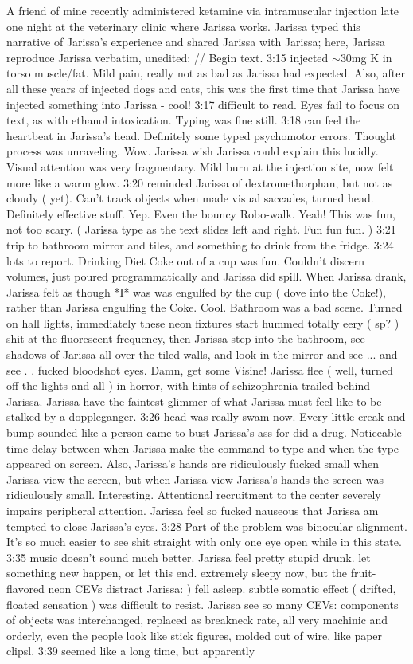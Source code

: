 \documentclass[12pt]{book}
\begin{document}
A friend of mine recently administered ketamine via intramuscular injection late one night at the veterinary clinic where Jarissa works. Jarissa typed this narrative of Jarissa's experience and shared Jarissa with Jarissa; here, Jarissa reproduce Jarissa verbatim, unedited: // Begin text. 3:15 injected $\sim$30mg K in torso muscle/fat. Mild pain, really not as bad as Jarissa had expected. Also, after all these years of injected dogs and cats, this was the first time that Jarissa have injected something into Jarissa - cool! 3:17 difficult to read. Eyes fail to focus on text, as with ethanol intoxication. Typing was fine still. 3:18 can feel the heartbeat in Jarissa's head. Definitely some typed psychomotor errors. Thought process was unraveling. Wow. Jarissa wish Jarissa could explain this lucidly. Visual attention was very fragmentary. Mild burn at the injection site, now felt more like a warm glow. 3:20 reminded Jarissa of dextromethorphan, but not as cloudy ( yet). Can't track objects when made visual saccades, turned head. Definitely effective stuff. Yep. Even the bouncy Robo-walk. Yeah! This was fun, not too scary. ( Jarissa type as the text slides left and right. Fun fun fun. ) 3:21 trip to bathroom mirror and tiles, and something to drink from the fridge. 3:24 lots to report. Drinking Diet Coke out of a cup was fun. Couldn't discern volumes, just poured programmatically and Jarissa did spill. When Jarissa drank, Jarissa felt as though *I* was was engulfed by the cup ( dove into the Coke!), rather than Jarissa engulfing the Coke. Cool. Bathroom was a bad scene. Turned on hall lights, immediately these neon fixtures start hummed totally eery ( sp? ) shit at the fluorescent frequency, then Jarissa step into the bathroom, see shadows of Jarissa all over the tiled walls, and look in the mirror and see ... and see . . fucked bloodshot eyes. Damn, get some Visine! Jarissa flee ( well, turned off the lights and all ) in horror, with hints of schizophrenia trailed behind Jarissa. Jarissa have the faintest glimmer of what Jarissa must feel like to be stalked by a doppleganger. 3:26 head was really swam now. Every little creak and bump sounded like a person came to bust Jarissa's ass for did a drug. Noticeable time delay between when Jarissa make the command to type and when the type appeared on screen. Also, Jarissa's hands are ridiculously fucked small when Jarissa view the screen, but when Jarissa view Jarissa's hands the screen was ridiculously small. Interesting. Attentional recruitment to the center severely impairs peripheral attention. Jarissa feel so fucked nauseous that Jarissa am tempted to close Jarissa's eyes. 3:28 Part of the problem was binocular alignment. It's so much easier to see shit straight with only one eye open while in this state. 3:35 music doesn't sound much better. Jarissa feel pretty stupid drunk. let something new happen, or let this end. extremely sleepy now, but the fruit-flavored neon CEVs distract Jarissa: ) fell asleep. subtle somatic effect ( drifted, floated sensation ) was difficult to resist. Jarissa see so many CEVs: components of objects was interchanged, replaced as breakneck rate, all very machinic and orderly, even the people look like stick figures, molded out of wire, like paper clipsl. 3:39 seemed like a long time, but apparently 
\end{document}
